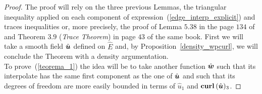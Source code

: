 \begin{proof}
The proof will rely on the three previous Lemmas, 
the triangular inequality applied on each component of 
expression~(\ref{edge_interp_explicit}) and traces inequalities or,
more precisely, the proof
of Lemma $5.38$ in the page $134$ of~\cite{monk}
and Theorem $3.9$ (\emph{Trace Theorem})
in page $43$ of
the same book.
First we will take a smooth field $\hat{\boldsymbol{u}}$ defined on $\hat{E}$
and, by Proposition~\ref{density_wpcurl}, we will conclude the Theorem 
with a density argumentation.\\[4pt]
To prove~(\ref{teorema_1}) the idea will be to take another function
$\hat{\boldsymbol{w}}$ such that its interpolate has the same first component
as the one of $\hat{\boldsymbol{u}}$ and such that its degrees of freedom are
more easily bounded in terms of $\hat{u}_1$ and $\textbf{curl\,}(\hat{\boldsymbol{u}})_3$.


\end{proof}
